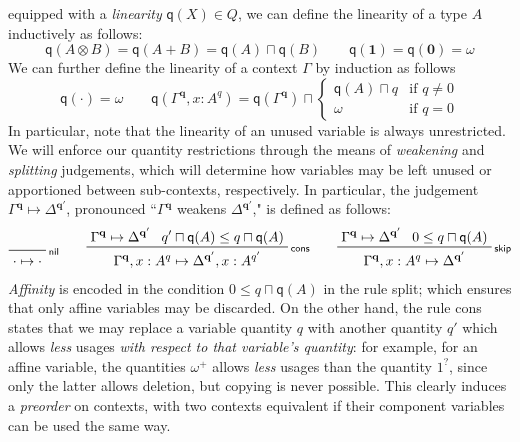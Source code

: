 \documentclass[acmsmall,screen,review]{acmart}
\newcommand{\mb}[1]{\ensuremath{\mathbf{#1}}}
\newcommand{\ms}[1]{\ensuremath{\mathsf{#1}}}
\newcommand{\cwk}[2]{#1 \mapsto #2}
\newcommand{\rle}[1]{{\scriptsize\textsf{#1}}}
\newcommand{\brle}[1]{{\textsf{#1}}}
\newcommand{\zeroq}{0}
\newcommand{\delq}{1^?}
\newcommand{\cpyq}{\omega^+}
\newcommand{\topq}{\omega}
\newcommand{\alquant}{\ms{q}}
\begin{document}
equipped with a \emph{linearity} $\alquant(X) \in Q$, we can define the linearity of a type $A$
inductively as follows:
\begin{equation}
  \alquant(A \otimes B) = \alquant(A + B) = \alquant(A) \sqcap \alquant(B) \qquad
  \alquant(\mb{1}) = \alquant(\mb{0}) = \topq
\end{equation}
We can further define the linearity of a context $\Gamma$ by induction as follows
\begin{equation}
  \alquant(\cdot) = \topq \qquad
  \alquant(\Gamma^{\mb{q}}, x : A^q) 
    = \alquant(\Gamma^{\mb{q}}) \sqcap \begin{cases}
    \alquant(A) \sqcap q & \text{if } q \neq 0 \\
    \topq & \text{if } q = 0
  \end{cases}
\end{equation}
In particular, note that the linearity of an unused variable is always unrestricted.
%
We will enforce our quantity restrictions through the means of \emph{weakening} and \emph{splitting}
judgements, which will determine how variables may be left unused or apportioned between
sub-contexts, respectively. In particular, the judgement $\cwk{\Gamma^{\mb{q}}}{\Delta^{\mb{q}'}}$,
pronounced ``$\Gamma^{\mb{q}}$ weakens $\Delta^{\mb{q'}}$," is defined as follows:
\begin{gather*}
  \prftree[r]{\rle{nil}}{\cwk{\cdot}{\cdot}} \qquad 
  \prftree[r]{\rle{cons}}
    {\cwk{\Gamma^{\mb{q}}}{\Delta^{\mb{q}'}}}
    {q' \sqcap \alquant(A) \leq q \sqcap \alquant(A)}
    {\cwk{\Gamma^{\mb{q}}, x : A^q}
         {\Delta^{\mb{q}'}, x : A^{q'}}} \qquad
  \prftree[r]{\rle{skip}}
    {\cwk{\Gamma^{\mb{q}}}{\Delta^{\mb{q}'}}}
    {\zeroq \leq q \sqcap \alquant(A)}
    {\cwk{\Gamma^{\mb{q}}, x : A^q}{\Delta}^{\mb{q}'}}
\end{gather*}
\emph{Affinity} is encoded in the condition $\zeroq \leq q \sqcap \alquant(A)$ in the rule
\brle{split}; which ensures that only affine variables may be discarded. On the other hand, the rule
\brle{cons} states that we may replace a variable quantity $q$ with another quantity $q'$ which
allows \emph{less} usages \emph{with respect to that variable's quantity}: for example, for an
affine variable, the quantities $\cpyq$ allows \emph{less} usages than the quantity $\delq$, since
only the latter allows deletion, but copying is never possible. This clearly induces a
\emph{preorder} on contexts, with two contexts equivalent if their component variables can be used
the same way.
\end{document}
